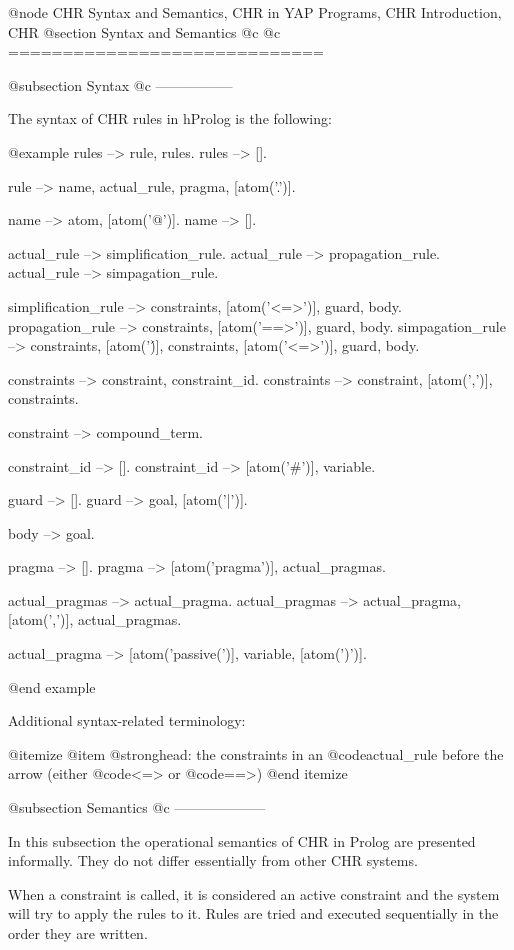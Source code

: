 @node CHR Syntax and Semantics, CHR in YAP Programs, CHR Introduction, CHR
@section Syntax and Semantics
@c		\label{sec:SyntaxAndSemantics}
@c =============================

@subsection Syntax
@c -----------------

The syntax of CHR rules in hProlog is the following:

@example
rules --> rule, rules.
rules --> [].

rule --> name, actual_rule, pragma, [atom('.')].

name --> atom, [atom('@')].
name --> [].

actual_rule --> simplification_rule.
actual_rule --> propagation_rule.
actual_rule --> simpagation_rule.

simplification_rule --> constraints, [atom('<=>')], guard, body.
propagation_rule --> constraints, [atom('==>')], guard, body.
simpagation_rule --> constraints, [atom('\')], constraints, [atom('<=>')], 
                     guard, body.

constraints --> constraint, constraint_id.
constraints --> constraint, [atom(',')], constraints.

constraint --> compound_term.

constraint_id --> [].
constraint_id --> [atom('#')], variable.

guard --> [].
guard --> goal, [atom('|')].

body --> goal.

pragma --> [].
pragma --> [atom('pragma')], actual_pragmas.

actual_pragmas --> actual_pragma.
actual_pragmas --> actual_pragma, [atom(',')], actual_pragmas.

actual_pragma --> [atom('passive(')], variable, [atom(')')].

@end example

Additional syntax-related terminology:

@itemize
@item @strong{head:} the constraints in an @code{actual_rule} before
                     the arrow (either @code{<=>} or @code{==>})
@end itemize

@subsection Semantics
@c --------------------

In this subsection the operational semantics of CHR in Prolog are presented
informally. They do not differ essentially from other CHR systems.

When a constraint is called, it is considered an active constraint and
the system will try to apply the rules to it. Rules are tried and executed
sequentially in the order they are written. 

